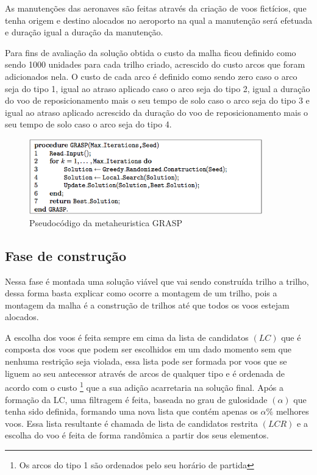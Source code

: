 \documentclass[12pt]{article}
\begin{document}
As manutenções das aeronaves são feitas através da criação de voos fictícios, que tenha origem e destino alocados no aeroporto na qual a manutenção será efetuada e duração igual a duração da manutenção.

Para fins de avaliação da solução obtida o custo da malha ficou definido como sendo 1000 unidades para cada trilho criado, acrescido do custo arcos que foram adicionados nela. O custo de cada arco é definido como sendo zero caso o arco seja do tipo 1, igual ao atraso aplicado caso o arco seja do tipo 2, igual a duração do voo de reposicionamento mais o seu tempo de solo caso o arco seja do tipo 3 e igual ao atraso aplicado acrescido da duração do voo de reposicionamento mais o seu tempo de solo caso o arco seja do tipo 4.

\begin{figure}[ht]
\centering
\includegraphics[width=0.9\textwidth]{grasp.png}
\caption{Pseudocódigo da metaheuristica GRASP}
\label{fig:grasp}
\end{figure}

\subsection{Fase de construção}

Nessa fase é montada uma solução viável que vai sendo construída trilho a trilho, dessa forma basta explicar como ocorre a montagem de um trilho, pois a montagem da malha é a construção de trilhos até que todos os voos estejam alocados. 

A escolha dos voos é feita sempre em cima da lista de candidatos $(LC)$ que
é composta dos voos que podem ser escolhidos em um dado momento sem 
que nenhuma restrição seja violada, essa lista pode ser formada por voos que
se liguem ao seu antecessor através de arcos de qualquer tipo e é ordenada 
de acordo com o custo \footnote{Os arcos do tipo 1 são ordenados pelo seu horário de partida} que a sua adição acarretaria na solução final. Após a 
formação da LC, uma filtragem é feita, baseada no grau de gulosidade 
$(\alpha)$ que tenha sido definida, formando uma nova lista que contém apenas os 
$\alpha\%$ melhores voos. Essa lista resultante é chamada de lista de 
candidatos restrita $(LCR)$ e a escolha do voo é feita de forma randômica 
a partir dos seus elementos.
\end{document}
